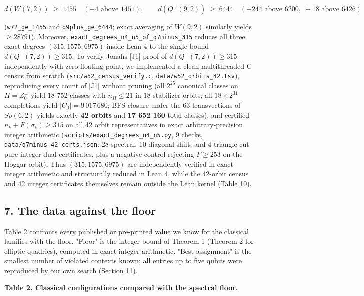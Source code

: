 \documentclass[11pt,a4paper]{article}
\begin{document}
\[d(W(7,2)) \;\ge\; 1455 \quad (+4\text{ above }1451), \qquad
d(Q^+(9,2)) \;\ge\; 6444 \quad (+244\text{ above }6200,\; +18\text{ above }6426)\]

(\texttt{w72\_ge\_1455} and \texttt{q9plus\_ge\_6444}; exact averaging of \(W(9,2)\) similarly yields \(\ge 28791\)). Moreover,
\nolinkurl{exact_degrees_n4_n5_of_q7minus_315} reduces all three exact degrees \((315, 1575, 6975)\) inside Lean 4 to
the single bound \(d(Q^-(7,2)) \ge 315\). To verify Jonah\textquotesingle s {[}J1{]} proof of \(d(Q^-(7,2)) \ge 315\)
independently with zero floating point, we implemented a clean multithreaded C census from scratch
(\nolinkurl{src/w52_census_verify.c}, \nolinkurl{data/w52_orbits_42.tsv}), reproducing every count of {[}J1{]} without pruning
(all \(2^{25}\) canonical classes on \(H = Z_0^\perp\) yield 18 752 classes with \(n_H \le 21\) in 18
stabilizer orbits; all \(18 \times 2^{31}\) completions yield \(|C_0| = 9\,017\,680\); BFS closure under the
63 transvections of \(Sp(6,2)\) yields exactly \textbf{42 orbits} and \textbf{17 652 160} total classes), and
certified \(n_k + F(\sigma_k) \ge 315\) on all 42 orbit representatives in exact arbitrary-precision
integer arithmetic (\nolinkurl{scripts/exact_degrees_n4_n5.py}, 9 checks, \nolinkurl{data/q7minus_42_certs.json}: 28 spectral,
10 diagonal-shift, and 4 triangle-cut pure-integer dual certificates, plus a negative control rejecting
\(F \ge 253\) on the Hoggar orbit). Thus \((315, 1575, 6975)\) are independently verified in exact integer
arithmetic and structurally reduced in Lean 4, while the 42-orbit census and 42 integer certificates
themselves remain outside the Lean kernel (Table 10).

\subsection{7. The data against the floor}\label{7-the-data-against-the-floor}

Table 2 confronts every published or pre-printed value we know for the classical families with the
floor. "Floor" is the integer bound of Theorem 1 (Theorem 2 for elliptic quadrics), computed in exact
integer arithmetic. "Best assignment" is the smallest number of violated contexts known; all entries up
to five qubits were reproduced by our own search (Section 11).

\textbf{Table 2. Classical configurations compared with the spectral floor.}
\end{document}
